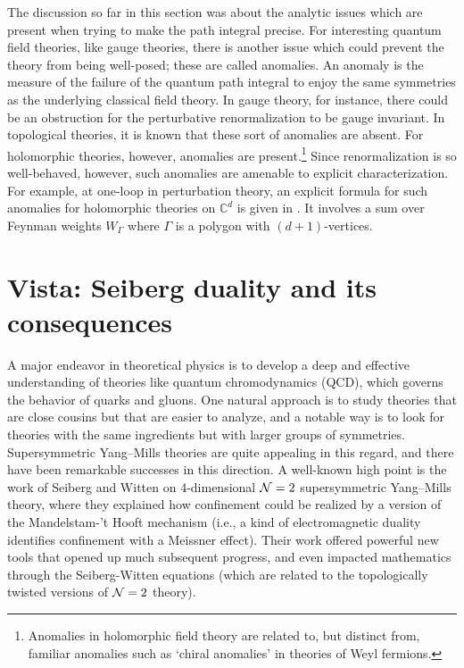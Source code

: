 \documentclass[11pt]{amsart}
\def\C{{\mathbb{C}}}
\begin{document}
The discussion so far in this section was about the analytic issues which are present when trying to make the path integral precise.
For interesting quantum field theories, like gauge theories, there is another issue which could prevent the theory from being well-posed; these are called anomalies.
An anomaly is the measure of the failure of the quantum path integral to enjoy the same symmetries as the underlying classical field theory.
In gauge theory, for instance, there could be an obstruction for the perturbative renormalization to be gauge invariant.
In topological theories, it is known that these sort of anomalies are absent.
For holomorphic theories, however, anomalies are present.\footnote{Anomalies in holomorphic field theory are related to, but distinct from, familiar anomalies such as `chiral anomalies' in theories of Weyl fermions.}
Since renormalization is so well-behaved, however, such anomalies are amenable to explicit characterization.
For example, at one-loop in perturbation theory, an explicit formula for such anomalies for holomorphic theories on $\C^d$ is given in \cite{Whol}.
It involves a sum over Feynman weights $W_\Gamma$ where $\Gamma$ is a polygon with $(d+1)$-vertices.

\section{Vista: Seiberg duality and its consequences}
\label{sec: seiberg}

A major endeavor in theoretical physics is to develop a deep and effective understanding of theories like quantum chromodynamics (QCD), which governs the behavior of quarks and gluons.
One natural approach is to study theories that are close cousins but that are easier to analyze,
and a notable way is to look for theories with the same ingredients but with larger groups of symmetries.
Supersymmetric Yang--Mills theories are quite appealing in this regard,
and there have been remarkable successes in this direction.
A well-known high point is the work of Seiberg and Witten on 4-dimensional $\mathcal N =2$ supersymmetric Yang--Mills theory,
where they explained how confinement could be realized by a version of the Mandelstam-'t Hooft mechanism (i.e., a kind of electromagnetic duality identifies confinement with a Meissner effect).
Their work offered powerful new tools that opened up much subsequent progress,
and even impacted mathematics through the Seiberg-Witten equations (which are related to the topologically twisted versions of $\mathcal N=2$ theory).
\end{document}
